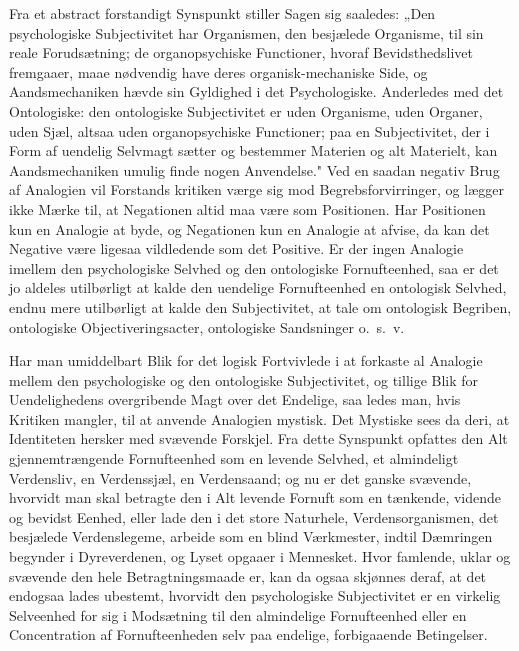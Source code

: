 \documentclass[12pt]{book}
\newcommand{\apage}[1]{\marginnote{\footnotesize\textit{[#1]}}}
\begin{document}
Fra et abstract forstandigt Synspunkt stiller Sagen sig saaledes: „Den psychologiske Subjectivitet
har Organismen, den besjælede Organisme, til sin reale Forudsætning; de organopsychiske Functioner,
hvoraf Bevidsthedslivet fremgaaer, maae nødvendig have deres organisk-mechaniske Side, og
Aandsmechaniken hævde sin Gyldighed i det Psychologiske. Anderledes med det Ontologiske: den
ontologiske Subjectivitet er uden Organisme, uden Organer, uden Sjæl, altsaa uden organopsychiske
Functioner; paa en Subjectivitet, der i Form af uendelig Selvmagt sætter og bestemmer Materien og alt
Materielt, kan Aandsmechaniken umulig finde nogen Anvendelse." Ved en saadan negativ Brug af
Analogien vil Forstands\-%
 \apage{424}kritiken værge sig mod Begrebsforvirringer, og lægger ikke Mærke til, at Negationen altid maa være
som Positionen. Har Positionen kun en Analogie at byde, og Negationen kun en Analogie at afvise, da
kan det Negative være ligesaa vildledende som det Positive. Er der ingen Analogie imellem den
psychologiske Selvhed og den ontologiske Fornufteenhed, saa er det jo aldeles utilbørligt at kalde
den uendelige Fornufteenhed en ontologisk Selvhed, endnu mere utilbørligt at kalde den Subjectivitet,
at tale om ontologisk Begriben, ontologiske Objectiveringsacter, ontologiske Sandsninger o.\ s.\ v.

Har man umiddelbart Blik for det logisk Fortvivlede i at forkaste al Analogie mellem den
psychologiske og den ontologiske Subjectivitet, og tillige Blik for Uendelighedens overgribende Magt
over det Endelige, saa ledes man, hvis Kritiken mangler, til at anvende Analogien mystisk. Det
Mystiske sees da deri, at Identiteten hersker med svævende Forskjel. Fra dette Synspunkt opfattes den
Alt gjennemtrængende Fornufteenhed som en levende Selvhed, et almindeligt Verdensliv, en Verdenssjæl,
en Verdensaand; og nu er det ganske svævende, hvorvidt man skal betragte den i Alt levende Fornuft
som en tænkende, vidende og bevidst Eenhed, eller lade den i det store Naturhele, Verdensorganismen,
det besjælede Verdenslegeme, arbeide som en blind Værkmester, indtil Dæmringen begynder i
Dyreverdenen, og Lyset opgaaer i Mennesket. Hvor famlende, uklar og svævende den hele
Betragtningsmaade er, kan da ogsaa skjønnes deraf, at det endogsaa lades ubestemt, hvorvidt den
psychologiske Subjectivitet er en virkelig Selveenhed for sig i Modsætning til den almindelige
Fornufteenhed eller en Concentration af Fornufteenheden selv paa endelige, forbigaaende Betingelser.
\end{document}
